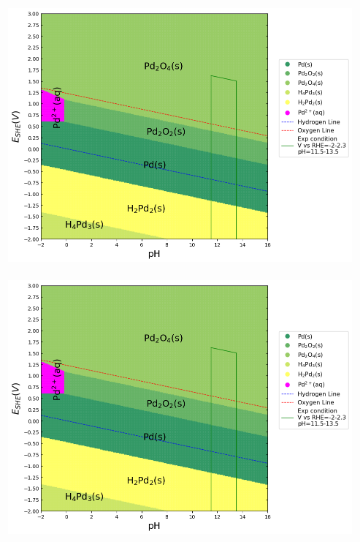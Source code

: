 \documentclass[journal=jacsat,manuscript=article]{achemso}
\begin{document}
\begin{figure}[htbp]
    \centering
    \begin{subfigure}[b]{0.3\textwidth}
        \subcaption{}\label{fig:Pd_Pourbaix_H2O}
        \includegraphics[width=\textwidth]{Figures/pourbaix_diagrams/Pd-NH3-H2O_activity=1e-04_[NH3]=0M_[Gly]=0M_[CN]=0.png}
        \par\medskip
    \end{subfigure}
    \begin{subfigure}[b]{0.3\textwidth}
        \subcaption{}\label{fig:Pd_Pourbaix_NH3_Gly}
        \includegraphics[width=\textwidth]{Figures/pourbaix_diagrams/Pd-NH3-H2O_activity=1e-04_[NH3]=0.02M_[Gly]=0.005M_[CN]=0.png}
        \par\medskip

\end{subfigure}
\end{figure}
\end{document}
